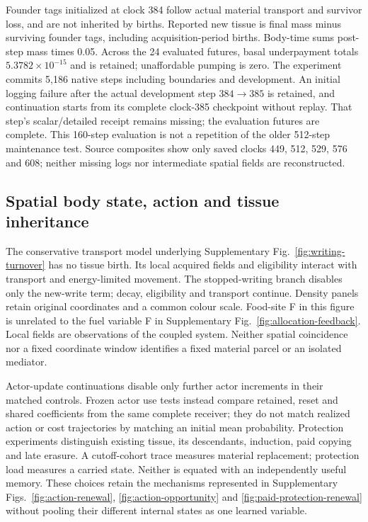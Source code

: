 Founder tags initialized at clock 384 follow actual material transport and survivor loss, and are not inherited by births. Reported new tissue is final mass minus surviving founder tags, including acquisition-period births. Body-time sums post-step mass times 0.05. Across the 24 evaluated futures, basal underpayment totals $5.3782\times10^{-15}$ and is retained; unaffordable pumping is zero. The experiment commits 5,186 native steps including boundaries and development. An initial logging failure after the actual development step $384\rightarrow385$ is retained, and continuation starts from its complete clock-385 checkpoint without replay. That step's scalar/detailed receipt remains missing; the evaluation futures are complete. This 160-step evaluation is not a repetition of the older 512-step maintenance test. Source composites show only saved clocks 449, 512, 529, 576 and 608; neither missing logs nor intermediate spatial fields are reconstructed.

\subsection*{Spatial body state, action and tissue inheritance}
The conservative transport model underlying Supplementary Fig.~\ref{fig:writing-turnover} has no tissue birth. Its local acquired fields and eligibility interact with transport and energy-limited movement. The stopped-writing branch disables only the new-write term; decay, eligibility and transport continue. Density panels retain original coordinates and a common colour scale. Food-site F in this figure is unrelated to the fuel variable F in Supplementary Fig.~\ref{fig:allocation-feedback}. Local fields are observations of the coupled system. Neither spatial coincidence nor a fixed coordinate window identifies a fixed material parcel or an isolated mediator.

Actor-update continuations disable only further actor increments in their matched controls. Frozen actor use tests instead compare retained, reset and shared coefficients from the same complete receiver; they do not match realized action or cost trajectories by matching an initial mean probability. Protection experiments distinguish existing tissue, its descendants, induction, paid copying and late erasure. A cutoff-cohort trace measures material replacement; protection load measures a carried state. Neither is equated with an independently useful memory. These choices retain the mechanisms represented in Supplementary Figs.~\ref{fig:action-renewal}, \ref{fig:action-opportunity} and \ref{fig:paid-protection-renewal} without pooling their different internal states as one learned variable.

